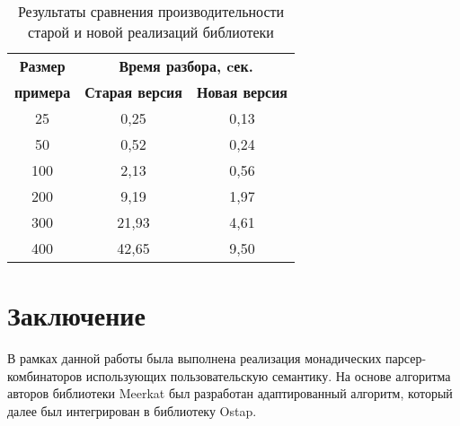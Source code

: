 \documentclass[conference]{IEEEtran}
\begin{document}
\begin{table}[htbp]
\begin{center}
\begin{tabular}{|c|c|c|}
\hline
\textbf{Размер} & \multicolumn{2}{|c|}{\textbf{Время разбора, cек.}} \\
\cline{2-3}
\textbf{примера} & \textbf{Старая версия} & \textbf{Новая версия} \\
\hline
25& 0,25& 0,13 \\
\hline
50& 0,52& 0,24 \\
\hline
100& 2,13& 0,56 \\
\hline
200& 9,19& 1,97 \\
\hline
300& 21,93& 4,61 \\
\hline
400& 42,65& 9,50 \\
\hline
\end{tabular}
\vskip3mm
\caption{Результаты сравнения производительности старой и новой реализаций библиотеки}
\label{tab1}
\end{center}
\end{table}


\section{Заключение}

В рамках данной работы была выполнена реализация монадических парсер-комбинаторов использующих пользовательскую семантику. На основе алгоритма авторов библиотеки Meerkat был
разработан адаптированный алгоритм, который далее был интегрирован в библиотеку Ostap.
\end{document}
